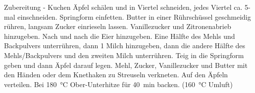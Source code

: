 \begin{recipestep}
    {Zubereitung - Kuchen}
    Äpfel schälen und in Viertel schneiden, jedes Viertel ca. 5-mal einschneiden. %
    Springform einfetten.
    Butter in einer Rührschüssel geschmeidig rühren, langsam Zucker einrieseln lassen.
    Vanillezucker und Zitronenabrieb hinzugeben. Nach und nach die Eier hinzugeben.
    Eine Hälfte des Mehls und Backpulvers unterrühren, dann \SI{1}{\el} Milch hinzugeben, dann die andere Hälfte des Mehls/Backpulvers und den zweiten \si{\el} Milch unterrühren.
    Teig in die Springform geben und dann Äpfel darauf legen.
    Mehl, Zucker, Vanillezucker und Butter mit den Händen oder dem Knethaken zu Streuseln verkneten. Auf den Äpfeln verteilen.
    Bei \SI{180}{\degreeCelsius} Ober-Unterhitze für \SI{40}{\minute} backen. (\SI{160}{\degreeCelsius} Umluft)
\end{recipestep}
